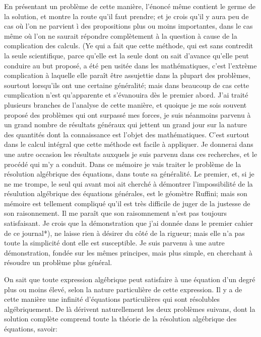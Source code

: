 \documentclass{article}
\begin{document}
En présentant un problème de cette manière, l'énoncé même contient le germe de la solution, et montre la route qu'il faut prendre; et je crois qu'il y aura peu de cas où l'on ne parvient ì des propositions plus ou moins importantes, dans le cas même où l'on ne saurait répondre complètement à la question à cause de la complication des calculs. (Ye qui a fait que cette méthode, qui est sans contredit la seule scientifique, parce qu'elle est la seule dont on sait d'avance qu'elle peut conduire au but proposé, a été pen usitée dans les mathématiques, c'est l'extrème complication à laquelle elle paraît être assujettie dans la plupart des problèmes, sourtout lorsqu'ils ont une certaine généralité; mais dans beaucoup de cas cette cumplication n'est qu'apparente et s'évanouira dès le premier abord. J'ai traité plusieurs branches de l'analyse de cette manière, et quoique je me sois souvent proposé des problèmes qui ont surpassé mes forces, je suis néanmoins parvenu à un grand nombre de résultats généraux qui jettent un grand jour sur la nature des quantités dont la connaissance est l'objet des mathématiques. C'est surtout dans le calcul intégral que cette méthode est facile à appliquer. Je donnerai dans une autre occasion les résultats auxquels je suis parvenu dans ces recherches, et le procédé qui m'y a conduit. Dans ce mémoire je vais traiter le problème de la résolution algébrique des équations, dans toute sa généralité. Le premier, et, si je ne me trompe, le seul qui avant moi ait cherché à démontrer l'impossibilité de la résulution algébrique des équations générales, est le géomètre Ruffini; mais son mémoire est tellement compliqué qu'il est très difficile de juger de la justesse de son raisonnement. Il me paraît que son raisomnement n'est pas toujours satisfaisant. Je crois que la démonstration que j'ai donnée dans le premier cahier de ce journal*), ne laisse rien à désirer du côté de la rigueur; mais elle n'a pas toute la simplicité dont elle est susceptible. Je suis parvenu à une autre démonstration, fondée sur les mêmes principes, mais plus simple, en cherchant à résoudre un problème plus général.

On sait que toute expression algébrique peut satisfaire à une équation d'un degré plus ou moins élevé, selon la nature particulière de cette expression. Il y a de cette manière une infinité d'équations particulières qui sont résolubles algébriquement. De là dérivent naturellement les deux problèmes suivans, dont la solution complète comprend toute la théorie de la résolution algébrique des équations, savoir:
\end{document}
